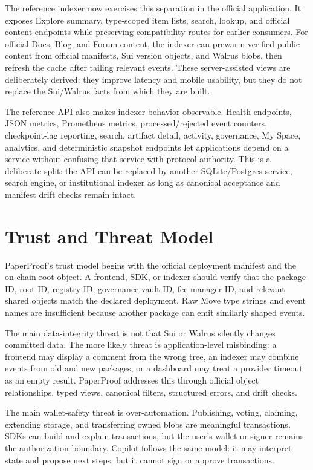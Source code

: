 \documentclass[journal]{IEEEtran}
\begin{document}
The reference indexer now exercises this separation in the official application.
It exposes Explore summary, type-scoped item lists, search, lookup, and official
content endpoints while preserving compatibility routes for earlier consumers.
For official Docs, Blog, and Forum content, the indexer can prewarm verified
public content from official manifests, Sui version objects, and Walrus blobs,
then refresh the cache after tailing relevant events. These server-assisted
views are deliberately derived: they improve latency and mobile usability, but
they do not replace the Sui/Walrus facts from which they are built.

The reference API also makes indexer behavior observable. Health endpoints,
JSON metrics, Prometheus metrics, processed/rejected event counters,
checkpoint-lag reporting, search, artifact detail, activity, governance, My
Space, analytics, and deterministic snapshot endpoints let applications depend
on a service without confusing that service with protocol authority. This is a
deliberate split: the API can be replaced by another SQLite/Postgres service,
search engine, or institutional indexer as long as canonical acceptance and
manifest drift checks remain intact.

\section{Trust and Threat Model}

PaperProof's trust model begins with the official deployment manifest and the on-chain root object. A frontend, SDK, or indexer should verify that the package ID, root ID, registry ID, governance vault ID, fee manager ID, and relevant shared objects match the declared deployment. Raw Move type strings and event names are insufficient because another package can emit similarly shaped events.

The main data-integrity threat is not that Sui or Walrus silently changes committed data. The more likely threat is application-level misbinding: a frontend may display a comment from the wrong tree, an indexer may combine events from old and new packages, or a dashboard may treat a provider timeout as an empty result. PaperProof addresses this through official object relationships, typed views, canonical filters, structured errors, and drift checks.

The main wallet-safety threat is over-automation. Publishing, voting, claiming, extending storage, and transferring owned blobs are meaningful transactions. SDKs can build and explain transactions, but the user's wallet or signer remains the authorization boundary. Copilot follows the same model: it may interpret state and propose next steps, but it cannot sign or approve transactions.
\end{document}
